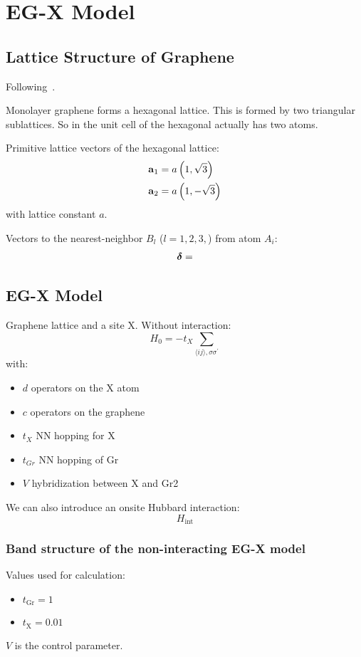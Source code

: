 \chapter{EG-X Model}\label{ch:eg-x-model}

\section{Lattice Structure of Graphene}\label{sec:lattice-structure-of-graphene}

Following~\cite{Yang_Li_Lee_Ng_2018}.

Monolayer graphene forms a hexagonal lattice.
This is formed by two triangular sublattices.
So in the unit cell of the hexagonal actually has two atoms.

Primitive lattice vectors of the hexagonal lattice:
\begin{align}
    \bm{\mathrm{a}}_1 &= a \left( 1, \sqrt{3} \right) \\
    \bm{\mathrm{a}}_2 &= a \left( 1, -\sqrt{3} \right)
\end{align}
with lattice constant \(a\).

Vectors to the nearest-neighbor \(B_l\) (\(l = 1, 2, 3,\)) from atom \(A_i\):
\begin{align}
    \bm{\mathrm{\delta}} =
\end{align}


\section{EG-X Model}\label{sec:eg-x-model}

Graphene lattice and a site X\@.
Without interaction:
\begin{equation}
    H_0 = -t_X \sum_{\langle ij \rangle, \sigma \sigma^{\prime}}
\end{equation}
with:
\begin{itemize}
    \item \(d\) operators on the X atom
    \item \(c\) operators on the graphene
    \item \(t_X\) NN hopping for X
    \item \(t_{Gr}\) NN hopping of Gr
    \item \(V\) hybridization between X and Gr2
\end{itemize}
We can also introduce an onsite Hubbard interaction:
\begin{equation}
    H_{\mathrm{int}}
\end{equation}

\subsection{Band structure of the non-interacting EG-X model}\label{subsec:band-structure-of-the-non-interacting-eg-x-model}

Values used for calculation:
\begin{itemize}
    \item \(t_{\mathrm{Gr}} = 1\)
    \item \(t_{\mathrm{X}} = 0.01\)
\end{itemize}
\(V\) is the control parameter.

